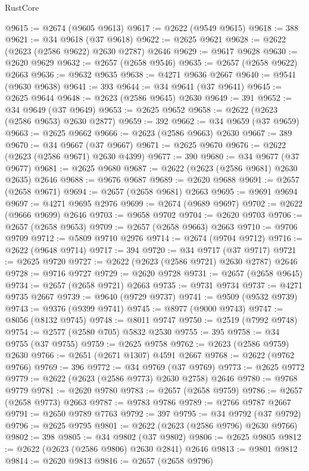 \begin{lexlean}{RustCore}
\begin{coremodule}
@9615 := @2674 (@9605 @9613)
@9617 := @2622 (@9549 @9615)
@9618 := 388
@9621 := @34 @9618 (@37 @9618)
@9622 := @2625 @9621
@9628 := @2622 (@2623 (@2586 @9622) @2630 @2787) @2646
@9629 := @9617 @9628
@9630 := @2620 @9629
@9632 := @2657 (@2658 @9546)
@9635 := @2657 (@2658 @9622) @2663
@9636 := @9632 @9635
@9638 := @4271 @9636 @2667
@9640 := @9541 (@9630 @9638)
@9641 := 393
@9644 := @34 @9641 (@37 @9641)
@9645 := @2625 @9644
@9648 := @2623 (@2586 @9645) @2630
@9649 := 391
@9652 := @34 @9649 (@37 @9649)
@9653 := @2625 @9652
@9658 := @2622 (@2623 (@2586 @9653) @2630 @2877)
@9659 := 392
@9662 := @34 @9659 (@37 @9659)
@9663 := @2625 @9662
@9666 := @2623 (@2586 @9663) @2630
@9667 := 389
@9670 := @34 @9667 (@37 @9667)
@9671 := @2625 @9670
@9676 := @2622 (@2623 (@2586 @9671) @2630 @4399)
@9677 := 390
@9680 := @34 @9677 (@37 @9677)
@9681 := @2625 @9680
@9687 := @2622 (@2623 (@2586 @9681) @2630 @2635) @2646
@9688 := @9676 @9687
@9689 := @2620 @9688
@9691 := @2657 (@2658 @9671)
@9694 := @2657 (@2658 @9681) @2663
@9695 := @9691 @9694
@9697 := @4271 @9695 @2976
@9699 := @2674 (@9689 @9697)
@9702 := @2622 (@9666 @9699) @2646
@9703 := @9658 @9702
@9704 := @2620 @9703
@9706 := @2657 (@2658 @9653)
@9709 := @2657 (@2658 @9663) @2663
@9710 := @9706 @9709
@9712 := @5809 @9710 @2976
@9714 := @2674 (@9704 @9712)
@9716 := @2622 (@9648 @9714)
@9717 := 394
@9720 := @34 @9717 (@37 @9717)
@9721 := @2625 @9720
@9727 := @2622 (@2623 (@2586 @9721) @2630 @2787) @2646
@9728 := @9716 @9727
@9729 := @2620 @9728
@9731 := @2657 (@2658 @9645)
@9734 := @2657 (@2658 @9721) @2663
@9735 := @9731 @9734
@9737 := @4271 @9735 @2667
@9739 := @9640 (@9729 @9737)
@9741 := @9509 (@9532 @9739)
@9743 := @9376 (@9399 @9741)
@9745 := @8977 (@9000 @9743)
@9747 := @8056 (@8132 @9745)
@9748 := @8011 @9747
@9750 := @2519 (@7992 @9748)
@9754 := @2577 (@2580 @705) @5832 @2530
@9755 := 395
@9758 := @34 @9755 (@37 @9755)
@9759 := @2625 @9758
@9762 := @2623 (@2586 @9759) @2630
@9766 := @2651 (@2671 @1307) @4591 @2667
@9768 := @2622 (@9762 @9766)
@9769 := 396
@9772 := @34 @9769 (@37 @9769)
@9773 := @2625 @9772
@9779 := @2622 (@2623 (@2586 @9773) @2630 @2758) @2646
@9780 := @9768 @9779
@9781 := @2620 @9780
@9783 := @2657 (@2658 @9759)
@9786 := @2657 (@2658 @9773) @2663
@9787 := @9783 @9786
@9789 := @2766 @9787 @2667
@9791 := @2650 @9789 @7763
@9792 := 397
@9795 := @34 @9792 (@37 @9792)
@9796 := @2625 @9795
@9801 := @2622 (@2623 (@2586 @9796) @2630 @9766)
@9802 := 398
@9805 := @34 @9802 (@37 @9802)
@9806 := @2625 @9805
@9812 := @2622 (@2623 (@2586 @9806) @2630 @2841) @2646
@9813 := @9801 @9812
@9814 := @2620 @9813
@9816 := @2657 (@2658 @9796)

\end{coremodule}
\end{lexlean}
